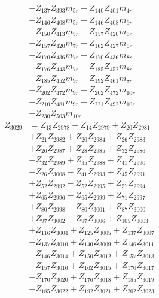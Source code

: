 \begin{multicols}{2}
\begin{align}
&- Z_{137}Z_{393}m_{5r} - Z_{140}Z_{401}m_{4r}  \nonumber \\
&- Z_{146}Z_{408}m_{5r} - Z_{146}Z_{408}m_{6r}  \nonumber \\
&- Z_{150}Z_{413}m_{5r} - Z_{157}Z_{420}m_{6r}  \nonumber \\
&- Z_{157}Z_{420}m_{7r} - Z_{162}Z_{427}m_{6r}  \nonumber \\
&- Z_{170}Z_{436}m_{7r} - Z_{170}Z_{436}m_{8r}  \nonumber \\
&- Z_{176}Z_{443}m_{7r} - Z_{185}Z_{452}m_{8r}  \nonumber \\
&- Z_{185}Z_{452}m_{9r} - Z_{192}Z_{461}m_{8r}  \nonumber \\
&- Z_{202}Z_{472}m_{9r} - Z_{202}Z_{472}m_{10r}  \nonumber \\
&- Z_{210}Z_{481}m_{9r} - Z_{221}Z_{492}m_{10r}  \nonumber \\
&- Z_{230}Z_{503}m_{10r} \nonumber \\
Z_{3029} &= Z_{13}Z_{2978} + Z_{14}Z_{2979} + Z_{20}Z_{2981}  \nonumber \\
&+ Z_{21}Z_{2982} + Z_{20}Z_{2984} + Z_{26}Z_{2983}  \nonumber \\
&+ Z_{26}Z_{2987} + Z_{28}Z_{2985} + Z_{32}Z_{2986}  \nonumber \\
&- Z_{32}Z_{2989} + Z_{35}Z_{2988} + Z_{41}Z_{2990}  \nonumber \\
&- Z_{26}Z_{3008} - Z_{41}Z_{2993} + Z_{45}Z_{2991}  \nonumber \\
&+ Z_{52}Z_{2992} - Z_{52}Z_{2995} + Z_{57}Z_{2994}  \nonumber \\
&+ Z_{65}Z_{2996} - Z_{65}Z_{2999} + Z_{71}Z_{2997}  \nonumber \\
&+ Z_{80}Z_{2998} - Z_{80}Z_{3001} + Z_{87}Z_{3000}  \nonumber \\
&+ Z_{97}Z_{3002} - Z_{97}Z_{3006} + Z_{105}Z_{3003}  \nonumber \\
&+ Z_{116}Z_{3004} + Z_{125}Z_{3005} + Z_{137}Z_{3007}  \nonumber \\
&- Z_{137}Z_{3010} + Z_{140}Z_{3009} + Z_{146}Z_{3011}  \nonumber \\
&- Z_{146}Z_{3014} + Z_{150}Z_{3012} + Z_{157}Z_{3013}  \nonumber \\
&- Z_{157}Z_{3016} + Z_{162}Z_{3015} + Z_{170}Z_{3017}  \nonumber \\
&- Z_{170}Z_{3020} + Z_{176}Z_{3018} + Z_{185}Z_{3019}  \nonumber \\
&- Z_{185}Z_{3022} + Z_{192}Z_{3021} + Z_{202}Z_{3023}  \nonumber \\

\end{align}
\end{multicols}
